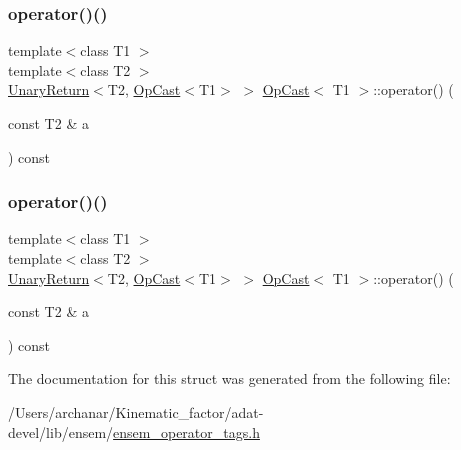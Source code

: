 \mbox{\label{structOpCast_a1a390481d419f2e62e4342c10ca6eabf}} 
\subsubsection{\texorpdfstring{operator()()}{operator()()}\hspace{0.1cm}{\footnotesize\ttfamily [2/3]}}
{\footnotesize\ttfamily template$<$class T1 $>$ \\
template$<$class T2 $>$ \\
\mbox{\hyperlink{structUnaryReturn}{Unary\+Return}}$<$T2, \mbox{\hyperlink{structOpCast}{Op\+Cast}}$<$T1$>$ $>$ \mbox{\hyperlink{structOpCast}{Op\+Cast}}$<$ T1 $>$\+::operator() (\begin{DoxyParamCaption}\item[{const T2 \&}]{a }\end{DoxyParamCaption}) const\hspace{0.3cm}{\ttfamily [inline]}}

\mbox{\label{structOpCast_a1a390481d419f2e62e4342c10ca6eabf}} 
\subsubsection{\texorpdfstring{operator()()}{operator()()}\hspace{0.1cm}{\footnotesize\ttfamily [3/3]}}
{\footnotesize\ttfamily template$<$class T1 $>$ \\
template$<$class T2 $>$ \\
\mbox{\hyperlink{structUnaryReturn}{Unary\+Return}}$<$T2, \mbox{\hyperlink{structOpCast}{Op\+Cast}}$<$T1$>$ $>$ \mbox{\hyperlink{structOpCast}{Op\+Cast}}$<$ T1 $>$\+::operator() (\begin{DoxyParamCaption}\item[{const T2 \&}]{a }\end{DoxyParamCaption}) const\hspace{0.3cm}{\ttfamily [inline]}}



The documentation for this struct was generated from the following file\+:\begin{DoxyCompactItemize}
\item 
/\+Users/archanar/\+Kinematic\+\_\+factor/adat-\/devel/lib/ensem/\mbox{\hyperlink{adat-devel_2lib_2ensem_2ensem__operator__tags_8h}{ensem\+\_\+operator\+\_\+tags.\+h}}\end{DoxyCompactItemize}
